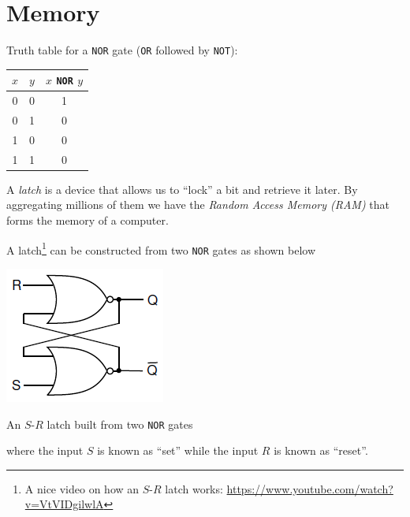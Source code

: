 \documentclass[8pt,a4paper,compress,handout]{beamer}
\begin{document}
\section{Memory}
\begin{frame}[fragile]
Truth table for a \lstinline{NOR} gate (\lstinline{OR} followed by \lstinline{NOT}):
\begin{center}
\begin{tabular}{cc|c}
$x$ & $y$ & $x$ \lstinline$NOR$ $y$ \\ \hline
0 & 0 & 1 \\
0 & 1 & 0 \\
1 & 0 & 0 \\
1 & 1 & 0
\end{tabular}
\end{center}

\bigskip

A \emph{latch} is a device that allows us to ``lock'' a bit and retrieve it later. By aggregating millions of them we have the \emph{Random Access Memory (RAM)} that forms the memory of a computer.

\bigskip

A latch\footnote{A nice video on how an $S$-$R$ latch works: \href{https://www.youtube.com/watch?v=VtVIDgilwlA}{https://www.youtube.com/watch?v=VtVIDgilwlA}} can be constructed from two \lstinline{NOR} gates as shown below
\begin{center}
\includegraphics[scale=0.4]{figures/latch.png}

\smallskip

\tiny An $S$-$R$ latch built from two \lstinline{NOR} gates
\end{center}
where the input $S$ is known as ``set'' while the input $R$ is known as ``reset''.
\end{frame}
\end{document}
